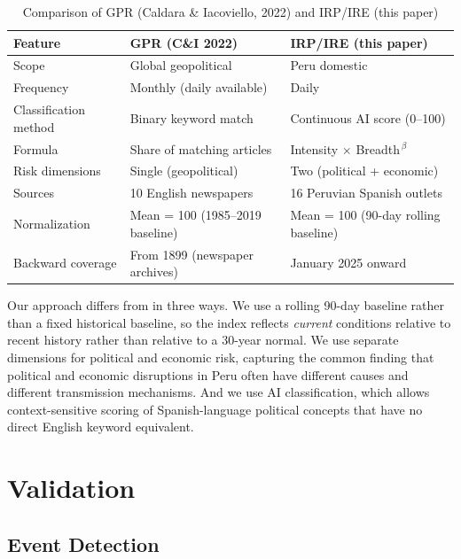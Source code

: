 \documentclass[12pt,a4paper]{article}
\begin{document}
\begin{table}[h!]
\centering
\caption{Comparison of GPR (Caldara \& Iacoviello, 2022) and IRP/IRE (this paper)}
\label{tab:comparison}
\small
\begin{tabularx}{\textwidth}{lXX}
\toprule
Feature & GPR (C\&I 2022) & IRP/IRE (this paper) \\
\midrule
Scope & Global geopolitical & Peru domestic \\
Frequency & Monthly (daily available) & Daily \\
Classification method & Binary keyword match & Continuous AI score (0--100) \\
Formula & Share of matching articles & Intensity $\times$ Breadth$^{\,\beta}$ \\
Risk dimensions & Single (geopolitical) & Two (political + economic) \\
Sources & 10 English newspapers & 16 Peruvian Spanish outlets \\
Normalization & Mean = 100 (1985--2019 baseline) & Mean = 100 (90-day rolling baseline) \\
Backward coverage & From 1899 (newspaper archives) & January 2025 onward \\
\bottomrule
\end{tabularx}
\end{table}

Our approach differs from \cite{caldara2022} in three ways.
We use a rolling 90-day baseline rather than a fixed historical baseline,
so the index reflects \emph{current} conditions relative to recent history
rather than relative to a 30-year normal.  We use separate dimensions for
political and economic risk, capturing the common finding that political
and economic disruptions in Peru often have different causes and different
transmission mechanisms.  And we use AI classification, which allows
context-sensitive scoring of Spanish-language political concepts that have
no direct English keyword equivalent.

\section{Validation}
\label{sec:validation}

\subsection{Event Detection}
\label{subsec:events}
\end{document}

